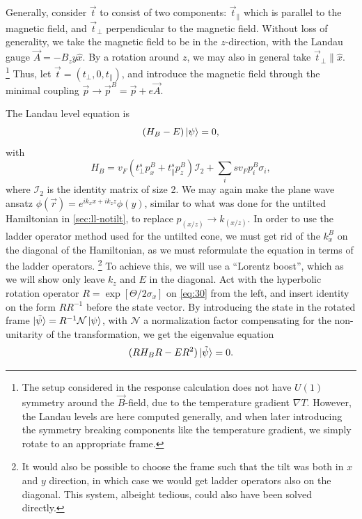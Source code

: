 Generally, consider \( \vec{t} \) to  consist of two components: \( \vec{t}_{\parallel} \) which is parallel to the magnetic field, and \( \vec{t}_{\perp} \) perpendicular to the magnetic field.
Without loss of generality, we take the magnetic field to be in the \( z \)-direction, with the Landau gauge \( \vec{A} = - B_z y \hat{x} \).
By a rotation around \( z \), we may also in general take \( \vec{t}_{\perp} \parallel \hat{x} \).~%
\footnote{
  The setup considered in the response calculation does not have \( U(1) \) symmetry around the \( \vec{B} \)-field, due to the temperature gradient \( \nabla T \).
  However, the Landau levels are here computed generally, and when later introducing the symmetry breaking components like the temperature gradient, we simply rotate to an appropriate frame.
}
Thus, let \( \vec{t} = (t_{\perp}, 0, t_{\parallel}) \), and introduce the magnetic field through the minimal coupling \( \vec{p} \to \vec{p}^B = \vec{p} + e \vec{A} \).

The Landau level equation is
\begin{equation}
  \label{eq:30}
  \left(H_{B} - E\right) \ket{\psi } = 0,
\end{equation}
with
\begin{equation}
  \label{eq:31}
  H_{B} = v_F \left(t^s _{\perp} p^B_{x} + t^s _{\parallel} p^B_{z} \right) \mathcal{I}_2 + \sum_i s v_{F} p^B_{i} \sigma _{i},
\end{equation}
where \(\mathcal{I}_{2}\) is the identity matrix of size 2.
We may again make the plane wave ansatz \( \phi(\vec{r}) = e^{i k_x x + i k_z z} \phi(y) \), similar to what was done for the untilted Hamiltonian in \cref{sec:ll-notilt}, to replace \( p_{(x /z)} \to k_{(x /z)} \).
In order to use the ladder operator method used for the untilted cone, we must get rid of the \(k^B_{x}\) on the diagonal of the Hamiltonian, as we must reformulate the equation in terms of the ladder operators.
\footnote{It would also be possible to choose the frame such that the tilt was both in \(x\) and \(y\) direction, in which case we would get ladder operators also on the diagonal.
  This system, albeight tedious, could also have been solved directly.
}
To achieve this, we will use a ``Lorentz boost'', which as we will show only leave \(k_{z}\) and \(E\) in the diagonal.
Act with the hyperbolic rotation operator \(R = \exp[\Theta /2 \sigma_{x}]\) on \cref{eq:30} from the left, and insert identity on the form \( R R^{-1} \) before the state vector.
By introducing the state in the rotated frame \(\ket{\tilde{\psi}} = R^{-1} \mathcal{N} \ket{\psi } \), with \(\mathcal{N}\) a normalization factor compensating for the non-unitarity of the transformation, we get the eigenvalue equation
\begin{equation}
  \label{eq:32}
  (R H_{B} R - E R^2) \ket{\tilde{\psi}} = 0.
\end{equation}

